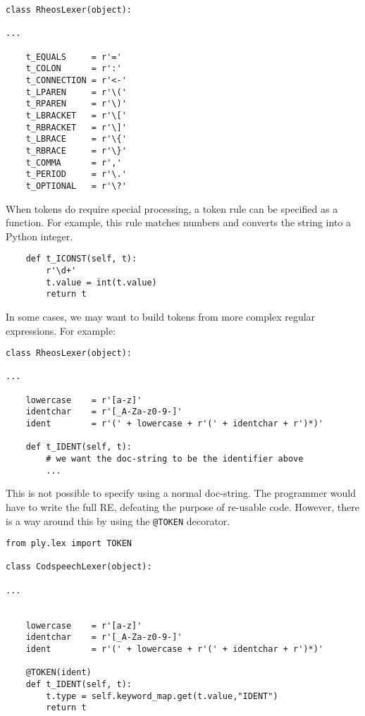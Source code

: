 \begin{lstlisting}
class RheosLexer(object):

...

    t_EQUALS     = r'='
    t_COLON      = r':'
    t_CONNECTION = r'<-'
    t_LPAREN     = r'\('
    t_RPAREN     = r'\)'
    t_LBRACKET   = r'\['
    t_RBRACKET   = r'\]'
    t_LBRACE     = r'\{'
    t_RBRACE     = r'\}'
    t_COMMA      = r','
    t_PERIOD     = r'\.'
    t_OPTIONAL   = r'\?'
\end{lstlisting}

When tokens do require special processing, a token rule can be
specified as a function. For example, this rule matches numbers and
converts the string into a Python integer.

\begin{lstlisting}
    def t_ICONST(self, t):
        r'\d+'
        t.value = int(t.value)
        return t
\end{lstlisting}

In some cases, we may want to build tokens from more complex regular
expressions. For example:

\begin{lstlisting}
class RheosLexer(object):

...

    lowercase    = r'[a-z]'
    identchar    = r'[_A-Za-z0-9-]'
    ident        = r'(' + lowercase + r'(' + identchar + r')*)'

    def t_IDENT(self, t):
        # we want the doc-string to be the identifier above
        ...
\end{lstlisting}

\noindent This is not possible to specify using a normal doc-string. The
programmer would have to write the full RE, defeating the purpose of
re-usable code. However, there is a way around this by using the
\texttt{@TOKEN} decorator.

\begin{lstlisting}
from ply.lex import TOKEN

class CodspeechLexer(object):

...


    lowercase    = r'[a-z]'
    identchar    = r'[_A-Za-z0-9-]'
    ident        = r'(' + lowercase + r'(' + identchar + r')*)'

    @TOKEN(ident)
    def t_IDENT(self, t):
        t.type = self.keyword_map.get(t.value,"IDENT")
        return t
\end{lstlisting}

